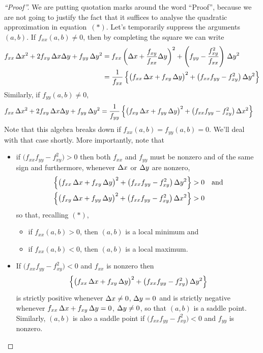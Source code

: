 \begin{proof}[``Proof'']
We are putting quotation marks around the word ``Proof'',
because we are not going to justify the fact that it suffices
to analyse the quadratic approximation in equation~$(*)$. 
Let's temporarily suppress the arguments $(a,b)$.
If $f_{xx}(a,b)\ne 0$, then by completing the square we can write
\begin{align*}
f_{xx}\,\Delta x^2
       +2f_{xy}\,\Delta x\Delta y 
       + f_{yy}\,\Delta y^2 
&=f_{xx}\left(\Delta x
       +\frac{f_{xy}}{f_{xx}}\Delta y\right)^2 
       +\left(f_{yy}-\frac{f_{xy}^2}{f_{xx}}\right)\,\Delta y^2 \\
&=\frac{1}{f_{xx}}\left\{\big(f_{xx}\,\Delta x+f_{xy}\,\Delta y\big)^2
                         +\big(f_{xx}f_{yy}-f_{xy}^2\big)\,\Delta y^2\right\}
\end{align*}
Similarly, if $f_{yy}(a,b)\ne 0$,
\begin{align*}
f_{xx}\,\Delta x^2
       +2f_{xy}\,\Delta x\Delta y 
       + f_{yy}\,\Delta y^2 
&=\frac{1}{f_{yy}}\left\{\big(f_{xy}\,\Delta x+f_{yy}\,\Delta y\big)^2
                         +\big(f_{xx}f_{yy}-f_{xy}^2\big)\,\Delta x^2\right\}
\end{align*}
Note that this algebra breaks down if $f_{xx}(a,b)=f_{yy}(a,b)=0$.
We'll deal with that case shortly. More importantly, note that
\begin{itemize}
\item
if $\big(f_{xx}f_{yy}-f_{xy}^2\big)>0$ then both $f_{xx}$ and $f_{yy}$ must
be nonzero and of the same sign and furthermore, whenever $\Delta x$ 
or $\Delta y$ are nonzero,
\begin{align*}
\left\{\big(f_{xx}\,\Delta x+f_{xy}\,\Delta y\big)^2
                         +\big(f_{xx}f_{yy}-f_{xy}^2\big)\,\Delta y^2\right\}
&>0\quad\text{and} \\
\left\{\big(f_{xy}\,\Delta x+f_{yy}\,\Delta y\big)^2
                         +\big(f_{xx}f_{yy}-f_{xy}^2\big)\,\Delta x^2\right\}
&>0
\end{align*}
so that, recalling $(*)$,
\begin{itemize}
\item
if $f_{xx}(a,b)>0$, then $(a,b)$ is a local minimum and
\item
if $f_{xx}(a,b)<0$, then $(a,b)$ is a local maximum.
\end{itemize}

\item
If $\big(f_{xx}f_{yy}-f_{xy}^2\big)<0$ and $f_{xx}$ is nonzero then
\begin{equation*}
\left\{\big(f_{xx}\,\Delta x+f_{xy}\,\Delta y\big)^2
                         +\big(f_{xx}f_{yy}-f_{xy}^2\big)\,\Delta y^2\right\}
\end{equation*}
is strictly positive whenever $\Delta x\ne 0$, $\Delta y= 0$ and is
strictly negative whenever $f_{xx}\,\Delta x+f_{xy}\,\Delta y=0$, $\Delta y\ne 0$, 
so that $(a,b)$ is a saddle point. Similarly, $(a,b)$ is also a saddle point
if $\big(f_{xx}f_{yy}-f_{xy}^2\big)<0$ and $f_{yy}$ is nonzero.


\end{itemize}
\end{proof}

